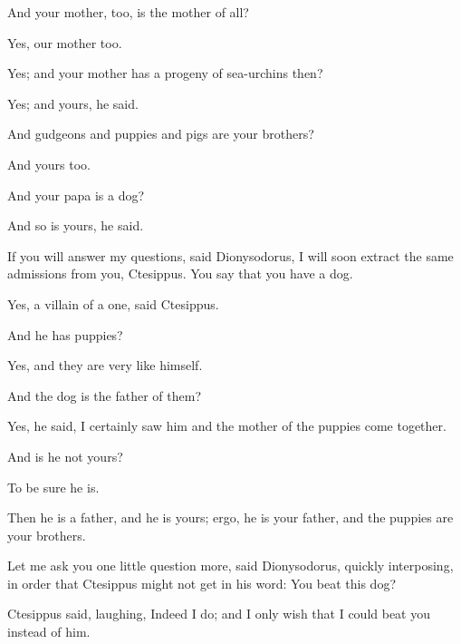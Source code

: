 \documentclass[11pt,letter]{article}
\begin{document}
\par  And your mother, too, is the mother of all?

\par  Yes, our mother too.

\par  Yes; and your mother has a progeny of sea-urchins then?

\par  Yes; and yours, he said.

\par  And gudgeons and puppies and pigs are your brothers?

\par  And yours too.

\par  And your papa is a dog?

\par  And so is yours, he said.

\par  If you will answer my questions, said Dionysodorus, I will soon extract the same admissions from you, Ctesippus. You say that you have a dog.

\par  Yes, a villain of a one, said Ctesippus.

\par  And he has puppies?

\par  Yes, and they are very like himself.

\par  And the dog is the father of them?

\par  Yes, he said, I certainly saw him and the mother of the puppies come together.

\par  And is he not yours?

\par  To be sure he is.

\par  Then he is a father, and he is yours; ergo, he is your father, and the puppies are your brothers.

\par  Let me ask you one little question more, said Dionysodorus, quickly interposing, in order that Ctesippus might not get in his word: You beat this dog?

\par  Ctesippus said, laughing, Indeed I do; and I only wish that I could beat you instead of him.
\end{document}
